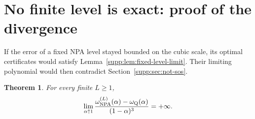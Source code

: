 \documentclass[aps,prl,onecolumn,10pt,superscriptaddress,nofootinbib,longbibliography]{revtex4-2}
\newtheorem{theorem}{Theorem}
\theoremstyle{remark}
\begin{document}
\section{No finite level is exact: proof of the divergence}
\label{supp:sec:main-proof}

If the error of a fixed NPA level stayed bounded on the cubic scale, its optimal certificates would satisfy Lemma~\ref{supp:lem:fixed-level-limit}. Their limiting polynomial would then contradict Section~\ref{supp:sec:not-sos}.

\begin{theorem}
\label{supp:thm:fixed-level}
For every finite $L\geq1$,
\begin{equation}
\lim_{\alpha\uparrow1}
\frac{\omega_{\rm NPA}^{(L)}(\alpha)-\omega_{\rm Q}(\alpha)}{(1-\alpha)^3}=+\infty.
\label{supp:eq:main-divergence}
\end{equation}
\end{theorem}
\end{document}

